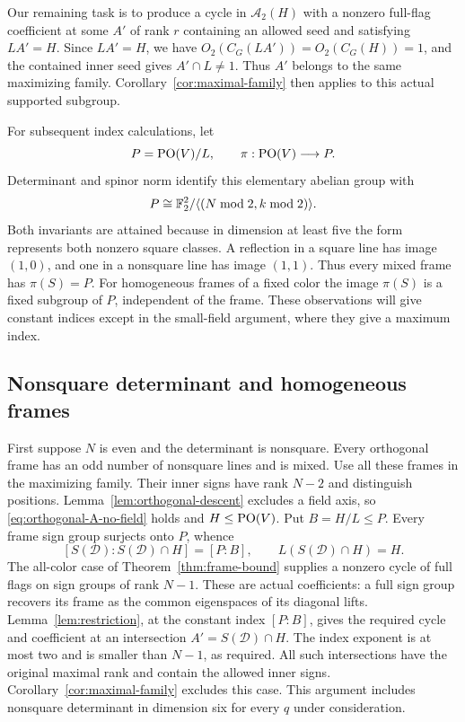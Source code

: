 Our remaining task is to produce a cycle in $\mathcal A_2(H)$ with a
nonzero full-flag coefficient at some $A'$ of rank $r$ containing an
allowed seed and satisfying $LA'=H$.  Since $LA'=H$,
we have $O_2(C_G(LA'))=O_2(C_G(H))=1$, and the contained inner seed
gives $A'\cap L\ne1$. Thus $A'$ belongs to the same maximizing family.
Corollary~\ref{cor:maximal-family} then applies to this actual supported
subgroup.

For subsequent index calculations, let
\[
 P=\operatorname{PO}(V)/L,\qquad \pi:\operatorname{PO}(V)\longrightarrow P.
\]
Determinant and spinor norm identify this elementary abelian group with
\begin{equation}\label{eq:orthogonal-outer-signs}
 P\cong\mathbb F_2^2/\langle(N\bmod2,k\bmod2)\rangle.
\end{equation}
Both invariants are attained because in dimension at least five the
form represents both nonzero square classes.  A reflection in a square
line has image $(1,0)$, and one in a nonsquare line has image $(1,1)$.
Thus every mixed frame has $\pi(S)=P$.  For homogeneous frames of a
fixed color the image $\pi(S)$ is a fixed subgroup of $P$, independent
of the frame.  These observations will give constant indices except in
the small-field argument, where they give a maximum index.

\subsection{Nonsquare determinant and homogeneous frames}

First suppose $N$ is even and the determinant is nonsquare.  Every
orthogonal frame has an odd number of nonsquare lines and is mixed.
Use all these frames in the maximizing family.  Their inner signs have
rank $N-2$ and distinguish positions.  Lemma~\ref{lem:orthogonal-descent}
excludes a field axis, so \eqref{eq:orthogonal-A-no-field} holds and
$H\le\operatorname{PO}(V)$.  Put $B=H/L\le P$.  Every frame sign group surjects
onto $P$, whence
\[
 [S(\mathcal D):S(\mathcal D)\cap H]=[P:B],
 \qquad L(S(\mathcal D)\cap H)=H.
\]
The all-color case of Theorem~\ref{thm:frame-bound} supplies a nonzero
cycle of full flags on sign groups of rank $N-1$.  These are actual
coefficients: a full sign group recovers its frame as the common
eigenspaces of its diagonal lifts.  Lemma~\ref{lem:restriction}, at the
constant index $[P:B]$, gives the required cycle and coefficient at an
intersection $A'=S(\mathcal D)\cap H$.  The index exponent is at most
two and is smaller than $N-1$, as required.  All such intersections
have the original maximal rank and contain the allowed inner signs.
Corollary~\ref{cor:maximal-family} excludes this case. This argument
includes nonsquare determinant in dimension six for every $q$ under
consideration.

